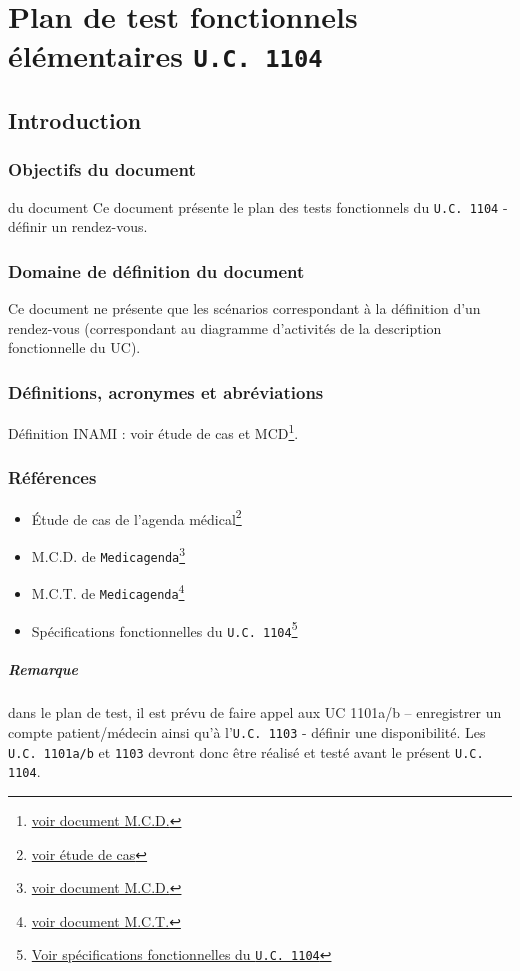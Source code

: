 \documentclass[a4paper, 11pt]{report}
\begin{document}

\tableofcontents
\chapter{Plan de test fonctionnels élémentaires \texttt{U.C. 1104}}
\section{Introduction}
\subsection{Objectifs du document}
du document Ce document présente  le plan des tests fonctionnels du \texttt{U.C. 1104} -
définir un rendez-vous. 
\subsection{Domaine de définition du document}
Ce document ne présente que les scénarios correspondant à la définition d’un
rendez-vous (correspondant au diagramme d’activités de la description fonctionnelle
du UC).
\subsection{Définitions, acronymes et abréviations}
Définition INAMI : voir étude de cas et MCD\footnote{\href{../MCD/MCD.pdf}{voir document M.C.D.}}.
\subsection{Références}
\begin{itemize}
	\item[] Étude de cas de l'agenda
		médical\footnote{\href{../Enonce_Travail_Synthese_14-15.pdf}{voir
		étude de cas}}
	\item[] M.C.D. de \texttt{Medicagenda}\footnote{\href{../MCD/MCD.pdf}{voir document M.C.D.}}
	\item[] M.C.T. de \texttt{Medicagenda}\footnote{\href{./MCT.pdf}{voir document M.C.T.}}
	\item[] Spécifications fonctionnelles du \texttt{U.C.
		1104}\footnote{\href{./specifications_fonctionnelles_UC_1104_definir_un_rendez-vous.pdf}{Voir
			spécifications fonctionnelles du \texttt{U.C. 1104}}}
	\end{itemize}

	\paragraph{Remarque}
	dans le plan de test, il est prévu de faire appel aux UC 1101a/b – enregistrer un compte
	patient/médecin ainsi qu'à l'\texttt{U.C. 1103} - définir une disponibilité.
	Les \texttt{U.C. 1101a/b} et \texttt{1103} devront
	donc être réalisé et testé avant le présent \texttt{U.C. 1104}.
\end{document}
